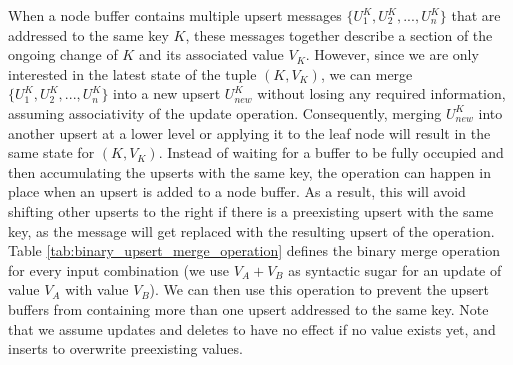 When a node buffer contains multiple upsert messages $\{U_1^K, U_2^K, ..., U_n^K\}$ that are addressed to the same key $K$, these messages together describe a section of the ongoing change of $K$ and its associated value $V_K$. However, since we are only interested in the latest state of the tuple $(K, V_K)$, we can merge $\{U_1^K, U_2^K, ..., U_n^K\}$ into a new upsert $U_{new}^K$ without losing any required information, assuming associativity of the update operation. Consequently, merging $U_{new}^K$ into another upsert at a lower level or applying it to the leaf node will result in the same state for $(K, V_K)$.\newline
Instead of waiting for a buffer to be fully occupied and then accumulating the upserts with the same key, the operation can happen in place when an upsert is added to a node buffer. As a result, this will avoid shifting other upserts to the right if there is a preexisting upsert with the same key, as the message will get replaced with the resulting upsert of the operation.\newline
Table \ref{tab:binary_upsert_merge_operation} defines the binary merge operation for every input combination (we use $V_A+V_B$ as syntactic sugar for an update of value $V_A$ with value $V_B$). We can then use this operation to prevent the upsert buffers from containing more than one upsert addressed to the same key. Note that we assume updates and deletes to have no effect if no value exists yet, and inserts to overwrite preexisting values.

